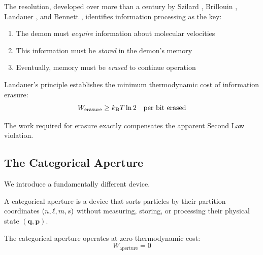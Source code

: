 The resolution, developed over more than a century by Szilard \cite{szilard1929}, Brillouin \cite{brillouin1951}, Landauer \cite{landauer1961}, and Bennett \cite{bennett1982,bennett2003}, identifies information processing as the key:
\begin{enumerate}
    \item The demon must \textit{acquire} information about molecular velocities
    \item This information must be \textit{stored} in the demon's memory
    \item Eventually, memory must be \textit{erased} to continue operation
\end{enumerate}

Landauer's principle establishes the minimum thermodynamic cost of information erasure:
\begin{equation}
W_{\text{erasure}} \geq k_{\mathrm{B}} T \ln 2 \quad \text{per bit erased}
\label{eq:landauer_principle}
\end{equation}

The work required for erasure exactly compensates the apparent Second Law violation.

\subsection{The Categorical Aperture}

We introduce a fundamentally different device.

\begin{definition}
A categorical aperture is a device that sorts particles by their partition coordinates $(n,\ell,m,s)$ without measuring, storing, or processing their physical state $(\mathbf{q}, \mathbf{p})$.
\end{definition}

\begin{theorem}
\label{thm:aperture}
The categorical aperture operates at zero thermodynamic cost:
\begin{equation}
W_{\text{aperture}} = 0
\end{equation}
\end{theorem}

